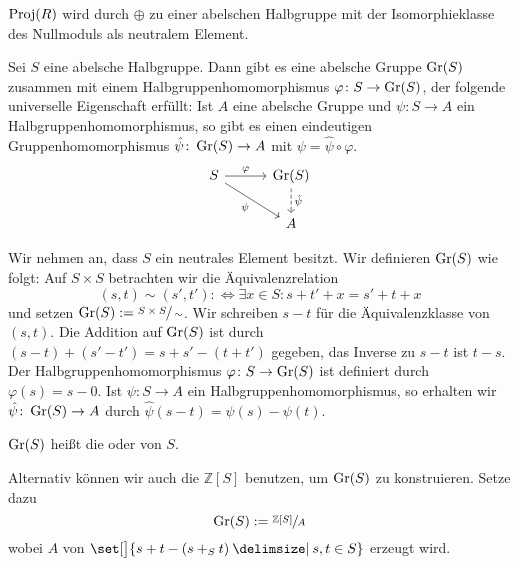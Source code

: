 \begin{bemerkung}[{name=[{Proj(R) als abelsche Halbgruppe}]}]
	$\operatorname{Proj}(R)$ wird durch $\oplus$ zu einer abelschen Halbgruppe mit der Isomorphieklasse des Nullmoduls als neutralem Element.
\end{bemerkung}

\begin{satz}[name={Grothendiek-Konstruktion}]
	Sei $S$ eine abelsche Halbgruppe.
	Dann gibt es eine abelsche Gruppe $\operatorname{Gr}(S)$ zusammen mit einem Halbgruppenhomomorphismus $\varphi \colon S\to \operatorname{Gr}(S)$, der folgende universelle Eigenschaft erfüllt:
	Ist $A$ eine abelsche Gruppe und $\psi \colon S \to A$ ein Halbgruppenhomomorphismus, so gibt es einen eindeutigen Gruppenhomomorphismus $\hat{\psi} \colon \operatorname{Gr}(S) \to A$ mit $\psi = \hat{\psi} \circ \varphi$.
	\[
		\begin{tikzcd}[column sep=3em]
			S \rar["\varphi"] \drar["\psi"'] & \Gr(S) \dar[dashed,"\hat{\psi}"] \\
			& A
		\end{tikzcd}
	\]
\end{satz}
\begin{beweis}
	Wir nehmen an, dass $S$ ein neutrales Element besitzt.
	Wir definieren $\operatorname{Gr}(S)$ wie folgt: Auf $S \times S$ betrachten wir die Äquivalenzrelation 
	\[
		(s,t) \sim (s',t') :\iff \exists x \in S : s +t' + x = s'+t +x
	\] 
	und setzen $\operatorname{Gr}(S) := \sfrac{S\times S}{\sim}$.
	Wir schreiben $s-t$ für die Äquivalenzklasse von $(s,t)$.
	Die Addition auf $\operatorname{Gr}(S)$ ist durch $(s-t) + (s'-t') = s+s'  - (t+t')$ gegeben, das Inverse zu $s-t$ ist $t-s$.
	Der Halbgruppenhomomorphismus $\varphi \colon S \to \operatorname{Gr}(S)$ ist definiert durch $\varphi(s)= s - 0$.
	Ist $\psi \colon S \to A$ ein Halbgruppenhomomorphismus, so erhalten wir $\hat{\psi} \colon \operatorname{Gr}(S) \to A$ durch $\hat{\psi}(s-t) = \psi(s)- \psi(t)$.
\end{beweis}

\begin{definition}[{name=[{Grothendiek-Gruppe}]}]
	$\operatorname{Gr}(S)$ heißt die  oder  von $S$.  
\end{definition}

\begin{bemerkung}[{name=[alternative Konstruktion mit freier abelscher Gruppe]}]
	Alternativ können wir auch die  $\mathbb{Z}[S]$ benutzen, um $\operatorname{Gr}(S)$ zu konstruieren.
  Setze dazu
	\[
		\operatorname{Gr}(S) := \sfrac{\mathbb{Z}[S]}{A}
	\]
	wobei $A$ von $\set[\big]{s + t-(s +_S t) \given s,t \in S}$ erzeugt wird.
\end{bemerkung}


